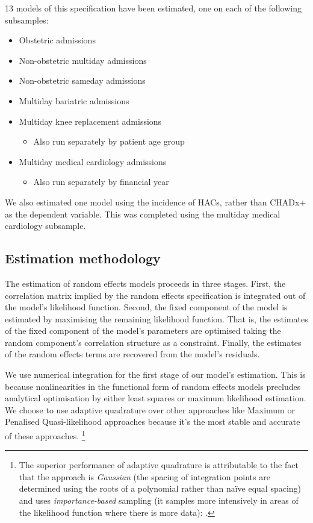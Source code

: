 \documentclass[submission]{grattan}
\begin{document}
13 models of this specification have been estimated, one on each of the following subsamples:

\begin{itemize}
\item
  Obstetric admissions
\item
  Non-obstetric multiday admissions
\item
  Non-obstetric sameday admissions
\item
  Multiday bariatric admissions
\item
  Multiday knee replacement admissions

  \begin{itemize}
  \item
    Also run separately by patient age group
  \end{itemize}
\item
  Multiday medical cardiology admissions

  \begin{itemize}
  \item
    Also run separately by financial year
  \end{itemize}
\end{itemize}

We also estimated one model using the incidence of HACs, rather than CHADx+ as the dependent variable.
This was completed using the multiday medical cardiology subsample.

\subsection{Estimation methodology}\label{subsec:estimation-methodology}

The estimation of random effects models proceeds in three stages.
First, the correlation matrix implied by the random effects specification is integrated out of the model's likelihood function.
Second, the fixed component of the model is estimated by maximising the remaining likelihood function.
That is, the estimates of the fixed component of the model's parameters are optimised taking the random component's correlation structure as a constraint.
Finally, the estimates of the random effects terms are recovered from the model's residuals.

We use numerical integration for the first stage of our model's estimation.
This is because nonlinearities in the functional form of random effects models precludes analytical optimisation by either least squares or maximum likelihood estimation.
We choose to use adaptive quadrature over other approaches like Maximum or Penalised Quasi-likelihood approaches because it's the most stable and accurate of these approaches.%
  \footnote{The superior performance of adaptive quadrature is attributable to the fact that the approach is
  \emph{Gaussian} (the spacing of integration points are determined using the roots of a polynomial rather than
  naïve equal spacing) and uses \emph{importance-based} sampling (it samples more intensively in areas of the
  likelihood function where there is more data): \textcites{Hasketh-2002-Reliable-estimate-glm-adaptive-quadrature}{Haan2006-Stata}.}
\end{document}
